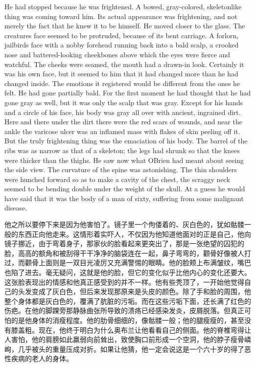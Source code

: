 \begin{paracol}{2}
He had stopped because he was frightened. A bowed, gray-colored,
skeletonlike thing was coming toward him. Its actual appearance was
frightening, and not merely the fact that he knew it to be himself. He
moved closer to the glass. The creature\textquotesingle s face seemed to
be protruded, because of its bent carriage. A forlorn,
jailbird\textquotesingle s face with a nobby forehead running back into
a bald scalp, a crooked nose and battered-looking cheekbones above which
the eyes were fierce and watchful. The cheeks were seamed, the mouth had
a drawn-in look. Certainly it was his own face, but it seemed to him
that it had changed more than he had changed inside. The emotions it
registered would be different from the ones he felt. He had gone
partially bald. For the first moment he had thought that he had gone
gray as well, but it was only the scalp that was gray. Except for his
hands and a circle of his face, his body was gray all over with ancient,
ingrained dirt. Here and there under the dirt there were the red scars
of wounds, and near the ankle the varicose ulcer was an inflamed mass
with flakes of skin peeling off it. But the truly frightening thing was
the emaciation of his body. The barrel of the ribs was as narrow as that
of a skeleton; the legs had shrunk so that the knees were thicker than
the thighs. He saw now what O\textquotesingle Brien had meant about
seeing the side view. The curvature of the spine was astonishing. The
thin shoulders were hunched forward so as to make a cavity of the chest,
the scraggy neck seemed to be bending double under the weight of the
skull. At a guess he would have said that it was the body of a man of
sixty, suffering from some malignant disease.

\switchcolumn

他之所以要停下来是因为他害怕了。镜子里一个佝偻着的、灰白色的，犹如骷髅一般的东西正向他走来。这情形着实吓人，不仅因为他知道他面对的正是自己，他向镜子挪近，由于弯着身子，那家伙的脸看起来更突出了，那是一张绝望的囚犯的脸，高高的额角和被刮得干干净净的脑袋连在一起，鼻子弯弯的，颧骨好像被人打过，而颧骨上面则是一双目光凌厉又充满警惕的眼睛。他的脸颊上布满皱纹，嘴巴也陷了进去。毫无疑问，这就是他的脸，但它的变化似乎比他内心的变化还要大。这张脸表现出的情感和他真正感受到的并不一样。他有些秃顶了，一开始他觉得自己的头发变成了灰白色，但后来发现那原来是头皮的颜色。除了手和脸的周围，他整个身体都是灰白色的，覆满了肮脏的污垢。而在这些污垢下面，还长满了红色的伤疤。在他的脚踝旁那静脉曲张所导致的溃疡已经感染发炎，皮屑脱落。但真正可怕的是他身体的消瘦程度。他的肋骨细细的，像骷髅一般；他的腿瘦瘦的，甚至没有膝盖粗。现在，他终于明白为什么奥布兰让他看看自己的侧面。他的脊椎弯得让人害怕，他的肩膀如此羸弱向前耸出，致使胸口前形成一个空洞，他的脖子瘦骨嶙峋，几乎被头的重量压成对折。如果让他猜，他一定会说这是一个六十岁的得了恶性疾病的老人的身体。


\end{paracol}
